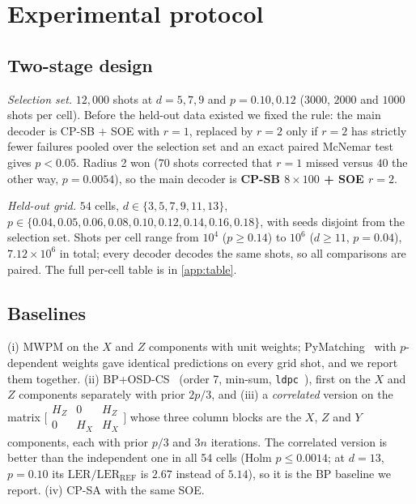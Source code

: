 \documentclass[journal]{IEEEtran}
\newcommand{\REF}{\mathrm{REF}}
\newcommand{\LER}{\mathrm{LER}}
\begin{document}
\section{Experimental protocol}
\label{sec:protocol}

\subsection{Two-stage design}
\emph{Selection set.} $12{,}000$ shots at $d=5,7,9$ and $p=0.10,0.12$ ($3000$, $2000$ and $1000$ shots per cell). Before the held-out data existed we fixed the rule: the main decoder is CP-SB + SOE with $r=1$, replaced by $r=2$ only if $r=2$ has strictly fewer failures pooled over the selection set and an exact paired McNemar test gives $p<0.05$. Radius 2 won ($70$ shots corrected that $r=1$ missed versus $40$ the other way, $p=0.0054$), so the main decoder is \textbf{CP-SB $8\times100$ + SOE $r=2$}.

\emph{Held-out grid.} $54$ cells, $d\in\{3,5,7,9,11,13\}$, $p\in\{0.04,0.05,0.06,0.08,0.10,0.12,0.14,0.16,0.18\}$, with seeds disjoint from the selection set. Shots per cell range from $10^4$ ($p\ge0.14$) to $10^6$ ($d\ge11$, $p=0.04$), $7.12\times10^6$ in total; every decoder decodes the same shots, so all comparisons are paired. The full per-cell table is in \cref{app:table}.

\subsection{Baselines}
(i) MWPM on the $X$ and $Z$ components with unit weights; PyMatching~\cite{higgott2022} with $p$-dependent weights gave identical predictions on every grid shot, and we report them together. (ii) BP+OSD-CS~\cite{panteleev2021,roffe2020} (order 7, min-sum, \texttt{ldpc}~\cite{ldpc}), first on the $X$ and $Z$ components separately with prior $2p/3$, and (iii) a \emph{correlated} version on the matrix $\bigl[\begin{smallmatrix}H_Z & 0 & H_Z\\ 0 & H_X & H_X\end{smallmatrix}\bigr]$ whose three column blocks are the $X$, $Z$ and $Y$ components, each with prior $p/3$ and $3n$ iterations. The correlated version is better than the independent one in all 54 cells (Holm $p\le 0.0014$; at $d=13$, $p=0.10$ its $\LER/\LER_\REF$ is $2.67$ instead of $5.14$), so it is the BP baseline we report. (iv) CP-SA with the same SOE.
\end{document}
